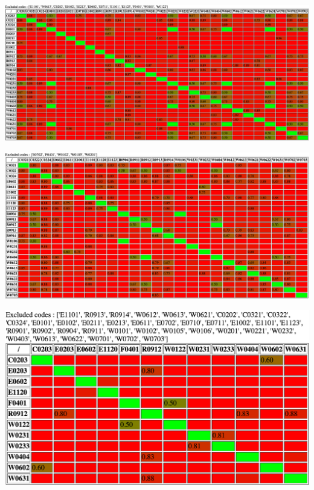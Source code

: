 \documentclass[12pt, a4paper]{article}
\begin{document}
\includegraphics[angle=90,origin=c,totalheight=0.99\textheight]{cap1}

\includegraphics[angle=90,origin=c,totalheight=\textheight]{cap2}

\includegraphics[angle=90,origin=c,totalheight=\textheight]{cap3}
\end{document}
